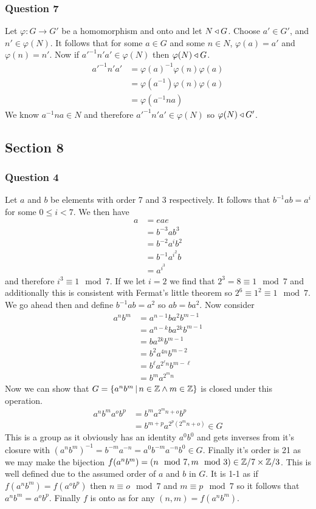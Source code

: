 \documentclass{article}
\begin{document}
\subsubsection{Question 7}
Let $\varphi: G\to G'$ be a homomorphism and onto and let $N \triangleleft G$. Choose $a' \in G'$, and $n' \in \varphi(N)$. It follows that for some $a\in G$ and some $n \in N$, $\varphi(a) = a'$ and $\varphi(n) = n'$. Now if $a'^{-1}n'a' \in \varphi(N)$ then $\varphi(N) \triangleleft G$.
\begin{align*}
a'^{-1}n'a' &= \varphi(a)^{-1}\varphi(n)\varphi(a) \\
&= \varphi(a^{-1})\varphi(n)\varphi(a) \\
&= \varphi(a^{-1}na)
\end{align*}
We know $a^{-1}na \in N$ and therefore $a'^{-1}n'a' \in \varphi(N)$ so $\varphi(N)\triangleleft G'$.

\subsection{Section 8}
\subsubsection{Question 4}
Let $a$ and $b$ be elements with order 7 and 3 respectively. It follows that $b^{-1}ab = a^i$ for some $0 \le i < 7$. We then have 
\begin{align*}
a &= eae\\
& = b^{-3}ab^3\\
& = b^{-2}a^ib^2\\
&= b^{-1}a^{i^2}b \\
&= a^{i^3}
\end{align*}
and therefore $i^3 \equiv 1 \mod 7$. If we let $i = 2$ we find that $2^3=8\equiv1\mod7$ and additionally this is consistent with Fermat's little theorem so $2^6 \equiv 1^2 \equiv 1 \mod 7$. We go ahead then and define $b^{-1}ab = a^2$ so $ab=ba^2$. Now consider
\begin{align*}
a^nb^m &= a^{n-1}ba^2b^{m-1} \\
&= a^{n-k}ba^{2k}b^{m-1} \\
&= ba^{2k}b^{m-1} \\
&= b^2a^{4n}b^{m-2} \\
&= b^\ell a^{2^\ell n}b^{m-\ell} \\
&= b^ma^{2^mn}
\end{align*}
Now we can show that $G= \left\{{a^nb^m} \,\middle|\, {n\in\mathbb Z\land m\in\mathbb Z}\right\}$ is closed under this operation.
\begin{align*}
a^nb^ma^ob^p &= b^ma^{2^mn+o}b^p \\
&= b^{m+p}a^{2^p\left(2^mn+o\right)} \in G
\end{align*}
This is a group as it obviously has an identity $a^0b^0$ and gets inverses from it's closure with $(a^nb^m)^{-1} =b^{-m}a^{-n}= a^0b^{-m}a^{-n}b^0 \in G$. Finally it's order is 21 as we may make the bijection $f(a^nb^m) = (n\mod 7,m\mod 3) \in \mathbb Z/7\times \mathbb Z/3$. This is well defined due to the assumed order of $a$ and $b$ in $G$. It is 1-1 as if $f(a^nb^m)=f(a^ob^p)$ then $n\equiv o\mod 7$ and $m\equiv p \mod 7$ so it follows that $a^nb^m = a^ob^p$. Finally $f$ is onto as for any $(n,m) = f(a^nb^m)$.
\end{document}
